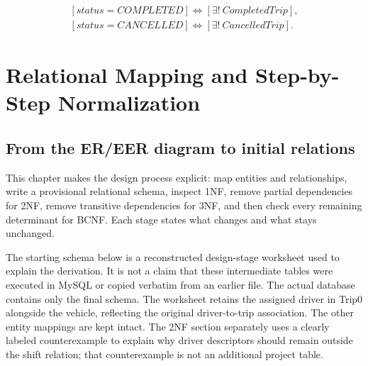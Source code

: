 \documentclass[11pt,a4paper]{article}
\renewcommand{\arraystretch}{1.3}
\begin{document}
\begin{center}\end{center}
\begin{equation*}
\begin{gathered}{}[status=COMPLETED]\iff[\exists!\ CompletedTrip],\\
[status=CANCELLED]\iff[\exists!\ CancelledTrip].\end{gathered}
\end{equation*}
\clearpage
\section{Relational Mapping and Step-by-Step Normalization}
\begingroup\setlength{\parskip}{4pt}\renewcommand{\arraystretch}{1.1}\lstset{aboveskip=5pt,belowskip=5pt}
\subsection{From the ER/EER diagram to initial relations}
This chapter makes the design process explicit: map entities and relationships, write a provisional relational schema, inspect 1NF, remove partial dependencies for 2NF, remove transitive dependencies for 3NF, and then check every remaining determinant for BCNF. Each stage states what changes and what stays unchanged.

The starting schema below is a reconstructed design-stage worksheet used to explain the derivation. It is not a claim that these intermediate tables were executed in MySQL or copied verbatim from an earlier file. The actual database contains only the final schema. The worksheet retains the assigned driver in Trip0 alongside the vehicle, reflecting the original driver-to-trip association. The other entity mappings are kept intact. The 2NF section separately uses a clearly labeled counterexample to explain why driver descriptors should remain outside the shift relation; that counterexample is not an additional project table.
\end{document}
